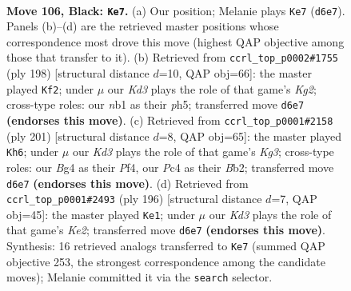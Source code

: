 \documentclass[11pt]{article}
\begin{document}
\clearpage

\begin{figure}[p]\centering
\begin{subfigure}{0.46\textwidth}\centering
\resizebox{\linewidth}{!}{%
\newchessgame
\chessboard[
  setfen={1B6/8/3k4/8/p1p3b1/8/5K2/1N6 b - - 67 106},
  showmover=false,
  pgfstyle=straightmove, color=movearrow, markmove={d6-e7}
]}
\caption{}
\end{subfigure}\hfill
\begin{subfigure}{0.46\textwidth}\centering
\resizebox{\linewidth}{!}{%
\newchessgame
\chessboard[
  setfen={8/8/5k2/7p/4b2P/8/6KB/8 w - - 1 100},
  showmover=false,
  pgfstyle=straightmove, color=movearrow, markmove={g2-f2}
]}
\caption{}
\end{subfigure}
\\[4pt]
\begin{subfigure}{0.46\textwidth}\centering
\resizebox{\linewidth}{!}{%
\newchessgame
\chessboard[
  setfen={8/8/6k1/8/4Bpp1/8/1b3K2/8 b - - 83 101},
  showmover=false,
  pgfstyle=straightmove, color=movearrow, markmove={g6-h6}
]}
\caption{}
\end{subfigure}\hfill
\begin{subfigure}{0.46\textwidth}\centering
\resizebox{\linewidth}{!}{%
\newchessgame
\chessboard[
  setfen={8/7B/8/4k2b/7P/8/4K3/8 w - - 1 99},
  showmover=false,
  pgfstyle=straightmove, color=movearrow, markmove={e2-e1}
]}
\caption{}
\end{subfigure}
\caption{\textbf{Move 106, Black: \texttt{Ke7}.} (a) Our position; Melanie plays \texttt{Ke7} (\texttt{d6e7}). Panels (b)--(d) are the retrieved master positions whose correspondence most drove this move (highest QAP objective among those that transfer to it). (b) Retrieved from \texttt{ccrl\_top\_p0002\#1755} (ply 198) [structural distance $d$=10, QAP obj=66]: the master played \texttt{Kf2}; under $\mu$ our \emph{Kd3} plays the role of that game's \emph{Kg2}; cross-type roles: our \emph{n}b1 as their \emph{p}h5; transferred move \texttt{d6e7} \textbf{(endorses this move)}. (c) Retrieved from \texttt{ccrl\_top\_p0001\#2158} (ply 201) [structural distance $d$=8, QAP obj=65]: the master played \texttt{Kh6}; under $\mu$ our \emph{Kd3} plays the role of that game's \emph{Kg3}; cross-type roles: our \emph{B}g4 as their \emph{P}f4, our \emph{P}c4 as their \emph{B}b2; transferred move \texttt{d6e7} \textbf{(endorses this move)}. (d) Retrieved from \texttt{ccrl\_top\_p0001\#2493} (ply 196) [structural distance $d$=7, QAP obj=45]: the master played \texttt{Ke1}; under $\mu$ our \emph{Kd3} plays the role of that game's \emph{Ke2}; transferred move \texttt{d6e7} \textbf{(endorses this move)}. Synthesis: 16 retrieved analogs transferred to \texttt{Ke7} (summed QAP objective 253, the strongest correspondence among the candidate moves); Melanie committed it via the \texttt{search} selector.}
\label{fig:thought-m211}
\end{figure}
\end{document}
